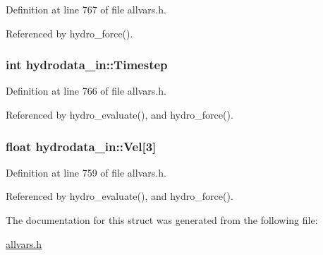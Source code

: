 Definition at line 767 of file allvars.h.



Referenced by hydro\_\-force().

\hypertarget{structhydrodata__in_a6b2160624adc7ad0304597845531ffa7}{
\subsubsection[{Timestep}]{\setlength{\rightskip}{0pt plus 5cm}int {\bf hydrodata\_\-in::Timestep}}}
\label{structhydrodata__in_a6b2160624adc7ad0304597845531ffa7}


Definition at line 766 of file allvars.h.



Referenced by hydro\_\-evaluate(), and hydro\_\-force().

\hypertarget{structhydrodata__in_aac935e4620b7700cae000a32a2922df4}{
\subsubsection[{Vel}]{\setlength{\rightskip}{0pt plus 5cm}float {\bf hydrodata\_\-in::Vel}\mbox{[}3\mbox{]}}}
\label{structhydrodata__in_aac935e4620b7700cae000a32a2922df4}


Definition at line 759 of file allvars.h.



Referenced by hydro\_\-evaluate(), and hydro\_\-force().



The documentation for this struct was generated from the following file:\begin{DoxyCompactItemize}
\item 
\hyperlink{allvars_8h}{allvars.h}\end{DoxyCompactItemize}
